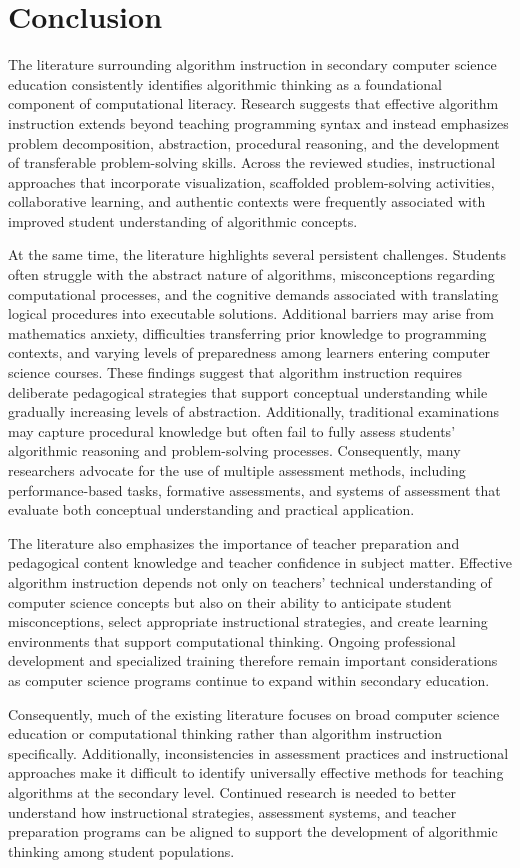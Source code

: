 % 
\section{Conclusion}
The literature surrounding algorithm instruction in secondary computer science education consistently identifies algorithmic thinking as a
  foundational component of computational literacy.
Research suggests that effective algorithm instruction extends beyond teaching programming syntax and instead emphasizes problem decomposition,
  abstraction, procedural reasoning, and the development of transferable problem-solving skills.
Across the reviewed studies, instructional approaches that incorporate visualization, scaffolded problem-solving activities, collaborative learning,
  and authentic contexts were frequently associated with improved student understanding of algorithmic concepts.

At the same time, the literature highlights several persistent challenges.
Students often struggle with the abstract nature of algorithms, misconceptions regarding computational processes, and the cognitive demands
  associated with translating logical procedures into executable solutions.
Additional barriers may arise from mathematics anxiety, difficulties transferring prior knowledge to programming contexts, and varying levels of
  preparedness among learners entering computer science courses.
These findings suggest that algorithm instruction requires deliberate pedagogical strategies that support conceptual understanding while gradually
  increasing levels of abstraction. 
Additionally, traditional examinations may capture procedural knowledge but often fail to fully assess students' algorithmic reasoning and problem-solving
  processes.
Consequently, many researchers advocate for the use of multiple assessment methods, including performance-based tasks, formative assessments, and
  systems of assessment that evaluate both conceptual understanding and practical application.

The literature also emphasizes the importance of teacher preparation and pedagogical content knowledge and teacher confidence in subject matter.
Effective algorithm instruction depends not only on teachers' technical understanding of computer science concepts but also on their ability to
  anticipate student misconceptions, select appropriate instructional strategies, and create learning environments that support computational thinking.
Ongoing professional development and specialized training therefore remain important considerations as computer science programs continue to expand
  within secondary education.

Consequently, much of the existing literature focuses on broad computer science education or computational thinking rather than algorithm instruction specifically.
Additionally, inconsistencies in assessment practices and instructional approaches make it difficult to identify universally effective methods for
  teaching algorithms at the secondary level.
Continued research is needed to better understand how instructional strategies, assessment systems, and teacher preparation programs can be aligned
  to support the development of algorithmic thinking among student populations.
% 
